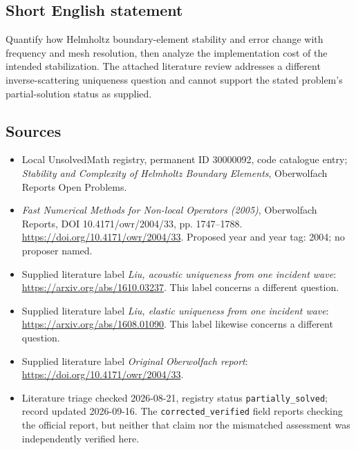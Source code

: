 \documentclass[11pt]{article}
\begin{document}
\subsection{Short English statement}
Quantify how Helmholtz boundary-element stability and error change with frequency and mesh resolution, then analyze the implementation cost of the intended stabilization. The attached literature review addresses a different inverse-scattering uniqueness question and cannot support the stated problem's partial-solution status as supplied.
\subsection{Sources}
\begin{itemize}\item Local UnsolvedMath registry, permanent ID 30000092, code catalogue entry; \emph{Stability and Complexity of Helmholtz Boundary Elements}, Oberwolfach Reports Open Problems.\item \emph{Fast Numerical Methods for Non-local Operators (2005)}, Oberwolfach Reports, DOI 10.4171/owr/2004/33, pp. 1747--1788. \url{https://doi.org/10.4171/owr/2004/33}. Proposed year and year tag: 2004; no proposer named.\item Supplied literature label \emph{Liu, acoustic uniqueness from one incident wave}: \url{https://arxiv.org/abs/1610.03237}. This label concerns a different question.\item Supplied literature label \emph{Liu, elastic uniqueness from one incident wave}: \url{https://arxiv.org/abs/1608.01090}. This label likewise concerns a different question.\item Supplied literature label \emph{Original Oberwolfach report}: \url{https://doi.org/10.4171/owr/2004/33}.\item Literature triage checked 2026-08-21, registry status \texttt{partially\_solved}; record updated 2026-09-16. The \texttt{corrected\_verified} field reports checking the official report, but neither that claim nor the mismatched assessment was independently verified here.\end{itemize}
\end{document}
